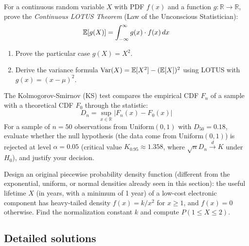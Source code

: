 \begin{problema}
	\label{prob:19f62fd}
	For a continuous random variable $X$ with PDF $f(x)$ and a function $g: \mathbb{R} \to \mathbb{R}$, prove the \emph{Continuous LOTUS Theorem} (Law of the Unconscious Statistician):
	$$\mathbb{E}[g(X)] = \int_{-\infty}^{\infty} g(x) \cdot f(x)\,dx$$
	\begin{enumerate}
		\item Prove the particular case $g(X) = X^{2}$.
		\item Derive the variance formula $\operatorname{Var}(X) = \mathbb{E}[X^{2}] - (\mathbb{E}[X])^{2}$ using LOTUS with $g(x) = (x - \mu)^{2}$.
	\end{enumerate}
\end{problema}

\begin{problema}
	\label{prob:8ec7e10}
	The Kolmogorov-Smirnov (KS) test compares the empirical CDF $F_{n}$ of a sample with a theoretical CDF $F_{0}$ through the statistic:
	$$D_{n} = \sup_{x \in \mathbb{R}} |F_{n}(x) - F_{0}(x)|$$
	For a sample of $n = 50$ observations from $\text{Uniform}(0, 1)$ with $D_{50} = 0.18$, evaluate whether the null hypothesis (the data come from $\text{Uniform}(0,1)$) is rejected at level $\alpha = 0.05$ (critical value $K_{0.95} \approx 1.358$, where $\sqrt{n} D_n \xrightarrow{d} K$ under $H_0$), and justify your decision.
\end{problema}

\begin{problema}
	\label{prob:0d490fc}
	Design an original piecewise probability density function (different from the exponential, uniform, or normal densities already seen in this section): the useful lifetime $X$ (in years, with a minimum of 1 year) of a low-cost electronic component has heavy-tailed density $f(x) = k/x^{2}$ for $x \ge 1$, and $f(x) = 0$ otherwise. Find the normalization constant $k$ and compute $P(1 \le X \le 2)$.
\end{problema}

\subsection*{Detailed solutions}

